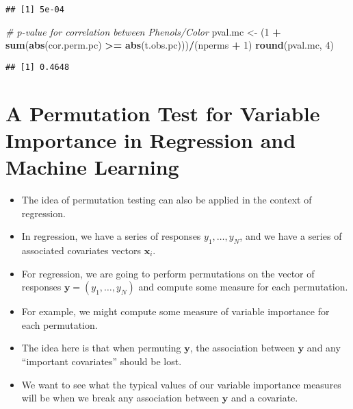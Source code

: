 \documentclass[]{book}
\newenvironment{Shaded}{\begin{snugshade}}{\end{snugshade}}
\newcommand{\CommentTok}[1]{\textcolor[rgb]{0.56,0.35,0.01}{\textit{#1}}}
\newcommand{\DecValTok}[1]{\textcolor[rgb]{0.00,0.00,0.81}{#1}}
\newcommand{\KeywordTok}[1]{\textcolor[rgb]{0.13,0.29,0.53}{\textbf{#1}}}
\newcommand{\NormalTok}[1]{#1}
\newcommand{\OperatorTok}[1]{\textcolor[rgb]{0.81,0.36,0.00}{\textbf{#1}}}
\newcommand{\StringTok}[1]{\textcolor[rgb]{0.31,0.60,0.02}{#1}}
\begin{document}
\begin{verbatim}
## [1] 5e-04
\end{verbatim}

\begin{Shaded}
\begin{Highlighting}[]
\CommentTok{# p-value for correlation between Phenols/Color}
\NormalTok{pval.mc <-}\StringTok{ }\NormalTok{(}\DecValTok{1} \OperatorTok{+}\StringTok{ }\KeywordTok{sum}\NormalTok{(}\KeywordTok{abs}\NormalTok{(cor.perm.pc) }\OperatorTok{>=}\StringTok{ }\KeywordTok{abs}\NormalTok{(t.obs.pc)))}\OperatorTok{/}\NormalTok{(nperms }\OperatorTok{+}\StringTok{ }\DecValTok{1}\NormalTok{)}
\KeywordTok{round}\NormalTok{(pval.mc, }\DecValTok{4}\NormalTok{)}
\end{Highlighting}
\end{Shaded}

\begin{verbatim}
## [1] 0.4648
\end{verbatim}

\hypertarget{a-permutation-test-for-variable-importance-in-regression-and-machine-learning}{%
\section{A Permutation Test for Variable Importance in Regression and Machine Learning}\label{a-permutation-test-for-variable-importance-in-regression-and-machine-learning}}

\begin{itemize}
\item
  The idea of permutation testing can also be applied in the context of regression.
\item
  In regression, we have a series of responses \(y_{1}, \ldots, y_{N}\), and
  we have a series of associated covariates vectors \(\mathbf{x}_{i}\).
\item
  For regression, we are going to perform permutations on the
  vector of responses \(\mathbf{y} = (y_{1}, \ldots, y_{N})\)
  and compute some measure for each permutation.
\item
  For example, we might compute some measure of variable importance
  for each permutation.
\item
  The idea here is that when permuting \(\mathbf{y}\), the association
  between \(\mathbf{y}\) and any ``important covariates'' should be lost.
\item
  We want to see what the typical values of our variable importance measures
  will be when we break any association between \(\mathbf{y}\) and
  a covariate.
\end{itemize}
\end{document}
